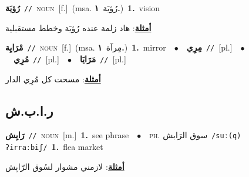 \documentclass[10pt,a4paper,twoside]{article} %
\begin{document}
\begin{multicols}{2}
{\setlength\topsep{0pt}\textbf{\foreignlanguage{arabic}{رُؤيَة}}\ {\color{gray}\texttt{//}\color{black}}\ \textsc{noun}\ [f.]\ \color{gray}(msa. \foreignlanguage{arabic}{رُؤيَة}~\foreignlanguage{arabic}{\textbf{١.}})\color{black}\ \textbf{1.}~vision\  \begin{flushright}\color{gray}\foreignlanguage{arabic}{\textbf{\underline{\foreignlanguage{arabic}{أمثلة}}}: هاد زلمة عنده رُؤيَة وخطط مستقبلية}\end{flushright}\color{black}} \vspace{2mm}

{\setlength\topsep{0pt}\textbf{\foreignlanguage{arabic}{مْرَايِة}}\ {\color{gray}\texttt{//}\color{black}}\ \textsc{noun}\ [f.]\ \color{gray}(msa. \foreignlanguage{arabic}{مِرآة}~\foreignlanguage{arabic}{\textbf{١.}})\color{black}\ \textbf{1.}~mirror\ \ $\bullet$\ \ \setlength\topsep{0pt}\textbf{\foreignlanguage{arabic}{مِرِي}}\ {\color{gray}\texttt{//}\color{black}}\ [pl.]\ \ $\bullet$\ \ \setlength\topsep{0pt}\textbf{\foreignlanguage{arabic}{مُرِي}}\ {\color{gray}\texttt{//}\color{black}}\ [pl.]\ \ $\bullet$\ \ \setlength\topsep{0pt}\textbf{\foreignlanguage{arabic}{مَرَايَا}}\ {\color{gray}\texttt{//}\color{black}}\ [pl.]\  \begin{flushright}\color{gray}\foreignlanguage{arabic}{\textbf{\underline{\foreignlanguage{arabic}{أمثلة}}}: مسحت كل مُرِي الدار}\end{flushright}\color{black}} \vspace{2mm}

\vspace{-3mm}
\subsection*{\color{blue}\foreignlanguage{arabic}{ر.ا.ب.ش}\color{blue}{ (ntws)}} 

{\setlength\topsep{0pt}\textbf{\foreignlanguage{arabic}{رَابِش}}\ {\color{gray}\texttt{//}\color{black}}\ \textsc{noun}\ [m.]\ \textbf{1.}~see phrase\ \ $\bullet$\ \ \textsc{ph.} \color{gray} \foreignlanguage{arabic}{سوق الرَابش}\color{black}\ {\color{gray}\texttt{/{\sffamily suː(q) ʔirraːbiʃ}/}\color{black}}\ \textbf{1.}~flea market\  \begin{flushright}\color{gray}\foreignlanguage{arabic}{\textbf{\underline{\foreignlanguage{arabic}{أمثلة}}}: لازمني مشوار لسُوق الرّابِش}\end{flushright}\color{black}} \vspace{2mm}


\end{multicols}
\end{document}
